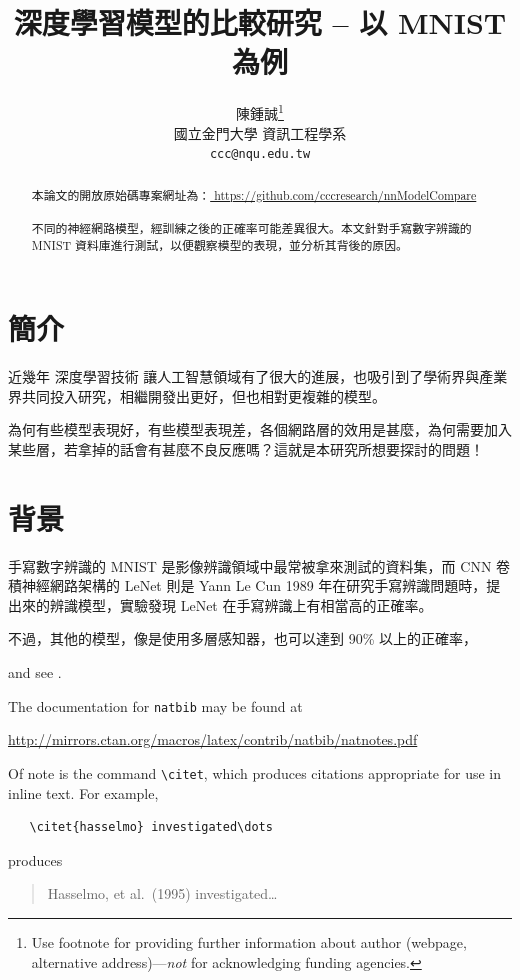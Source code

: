 \documentclass{article}
\title{深度學習模型的比較研究 -- 以 MNIST 為例}
\author{
  陳鍾誠\thanks{Use footnote for providing further
    information about author (webpage, alternative
    address)---\emph{not} for acknowledging funding agencies.} \\
  國立金門大學 資訊工程學系\\
  \texttt{ccc@nqu.edu.tw} \\
}
\begin{document}
\maketitle

\begin{abstract}
本論文的開放原始碼專案網址為：\url{ https://github.com/cccresearch/nnModelCompare }
\\
\\
不同的神經網路模型，經訓練之後的正確率可能差異很大。本文針對手寫數字辨識的MNIST 資料庫進行測試，以便觀察模型的表現，並分析其背後的原因。
\end{abstract}




\section{簡介}

近幾年 深度學習技術 讓人工智慧領域有了很大的進展，也吸引到了學術界與產業界共同投入研究，相繼開發出更好，但也相對更複雜的模型。

為何有些模型表現好，有些模型表現差，各個網路層的效用是甚麼，為何需要加入某些層，若拿掉的話會有甚麼不良反應嗎？這就是本研究所想要探討的問題！

\section{背景}
\label{background}

手寫數字辨識的 MNIST 是影像辨識領域中最常被拿來測試的資料集，而 CNN 卷積神經網路架構的 LeNet 則是 Yann Le Cun 1989 年在研究手寫辨識問題時，提出來的辨識模型，實驗發現 LeNet 在手寫辨識上有相當高的正確率。

不過，其他的模型，像是使用多層感知器，也可以達到 90\% 以上的正確率，


 \cite{kour2014real,kour2014fast} and see \cite{hadash2018estimate}.

The documentation for \verb+natbib+ may be found at
\begin{center}
  \url{http://mirrors.ctan.org/macros/latex/contrib/natbib/natnotes.pdf}
\end{center}
Of note is the command \verb+\citet+, which produces citations
appropriate for use in inline text.  For example,
\begin{verbatim}
   \citet{hasselmo} investigated\dots
\end{verbatim}
produces
\begin{quote}
  Hasselmo, et al.\ (1995) investigated\dots
\end{quote}
\end{document}
